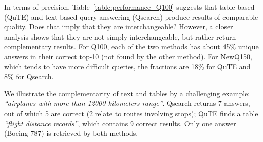 \vspace{0.1cm}
In terms of precision,  Table~\ref{table:performance_Q100} %
suggests
that table-based (QuTE) and text-based query answering (Qsearch) produce results of comparable quality.
 Does that imply that they are interchangeable? 
However, a closer analysis shows that they are not
simply interchangeable, but rather return complementary results.
For Q100, each of the two methods has about
45\% unique answers in their correct top-10
(not found by the other method).
For NewQ150, which tends to have more difficult queries,
the fractions are 18\% for QuTE and 8\% for Qsearch.

We illustrate the complementarity of text and tables by a challenging example: \emph{``airplanes with more than 12000 kilometers range''}.
Qsearch returns 7 answers, out of which 5 are correct 
(2 relate to routes involving stops); 
QuTE finds a table \emph{``flight distance records''}, which %
contains 9 correct results. Only one answer (Boeing-787) is
retrieved by both methods.

